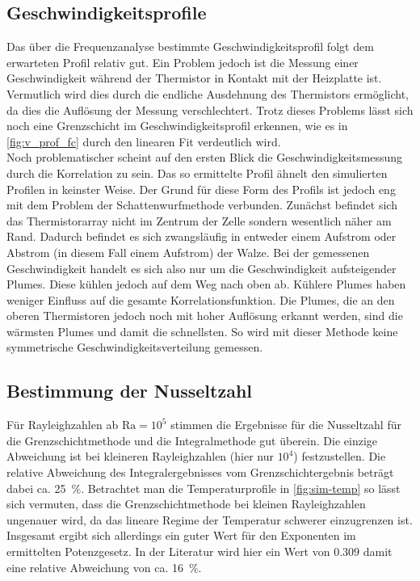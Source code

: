 \subsection{Geschwindigkeitsprofile}
Das über die Frequenzanalyse bestimmte Geschwindigkeitsprofil folgt dem erwarteten Profil relativ gut. Ein Problem jedoch ist die Messung einer Geschwindigkeit während der Thermistor in Kontakt mit der Heizplatte ist. Vermutlich wird dies durch die endliche Ausdehnung des Thermistors ermöglicht, da dies die Auflösung der Messung verschlechtert.
Trotz dieses Problems lässt sich noch eine Grenzschicht im Geschwindigkeitsprofil erkennen, wie es in \cref{fig:v_prof_fc} durch den linearen Fit verdeutlich wird.
\\
Noch problematischer scheint auf den ersten Blick die Geschwindigkeitsmessung durch die Korrelation zu sein.
Das so ermittelte Profil ähnelt den simulierten Profilen in keinster Weise. Der Grund für diese Form des Profils ist jedoch eng mit dem Problem der Schattenwurfmethode verbunden.
Zunächst befindet sich das Thermistorarray nicht im Zentrum der Zelle sondern wesentlich näher am Rand. 
Dadurch befindet es sich zwangsläufig in entweder einem Aufstrom oder Abstrom (in diesem Fall einem Aufstrom) der Walze.
Bei der gemessenen Geschwindigkeit handelt es sich also nur um die Geschwindigkeit aufsteigender Plumes.
Diese kühlen jedoch auf dem Weg nach oben ab. 
Kühlere Plumes haben weniger Einfluss auf die gesamte Korrelationsfunktion. 
Die Plumes, die an den oberen Thermistoren jedoch noch mit hoher Auflösung erkannt werden, sind die wärmsten Plumes und damit die schnellsten.
So wird mit dieser Methode keine symmetrische Geschwindigkeitsverteilung gemessen.

\subsection{Bestimmung der Nusseltzahl}
Für Rayleighzahlen ab $\text{Ra} = 10^5$ stimmen die Ergebnisse für die Nusseltzahl für die Grenzschichtmethode und die Integralmethode gut überein. Die einzige Abweichung ist bei kleineren Rayleighzahlen (hier nur $10^4$) festzustellen. Die relative Abweichung des Integralergebnisses vom Grenzschichtergebnis beträgt dabei ca. 25~\%.
Betrachtet man die Temperaturprofile in \cref{fig:sim-temp} so lässt sich vermuten, dass die Grenzschichtmethode bei kleinen Rayleighzahlen ungenauer wird, da das lineare Regime der Temperatur schwerer einzugrenzen ist.
\\
Insgesamt ergibt sich allerdings ein guter Wert für den Exponenten im ermittelten Potenzgesetz. In der Literatur wird hier ein Wert von $0.309$ \cite{expo} damit eine relative Abweichung von ca. 16~\%. 





